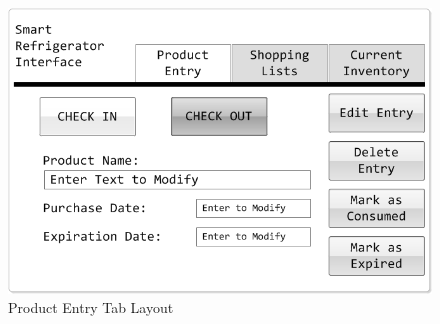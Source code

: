 \documentclass[11pt]{article} %
\begin{document}
\pagebreak
\begin{figure}[h!]
\vspace{0.5cm}
\begin{center}
\includegraphics[scale=0.5]{MockUp1}
\caption{Product Entry Tab Layout}
\label{mock1}
\end{center}
\end{figure}
\end{document}
